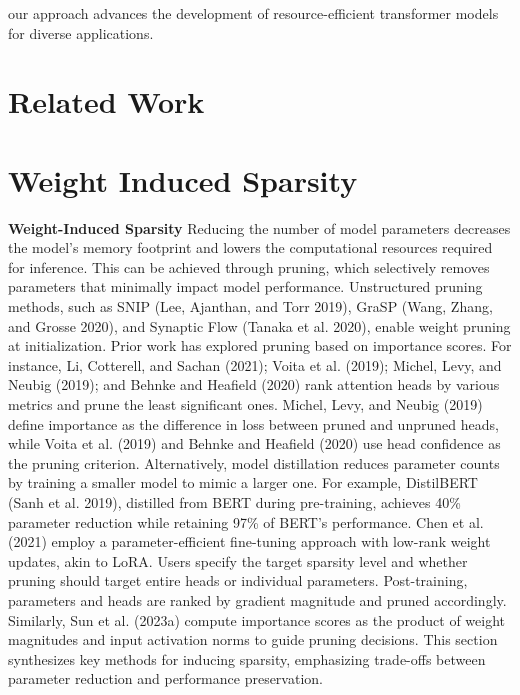 \documentclass[10pt,twocolumn]{article}
\begin{document}
our approach advances the development of resource-efficient transformer models for diverse applications.




\section{Related Work}




\section{Weight Induced Sparsity}

\textbf{Weight-Induced Sparsity} Reducing the number of model parameters decreases the model's memory footprint and lowers the computational resources required for inference. This can be achieved through pruning, which selectively removes parameters that minimally impact model performance. Unstructured pruning methods, such as SNIP (Lee, Ajanthan, and Torr 2019), GraSP (Wang, Zhang, and Grosse 2020), and Synaptic Flow (Tanaka et al. 2020), enable weight pruning at initialization. Prior work has explored pruning based on importance scores. For instance, Li, Cotterell, and Sachan (2021); Voita et al. (2019); Michel, Levy, and Neubig (2019); and Behnke and Heafield (2020) rank attention heads by various metrics and prune the least significant ones. Michel, Levy, and Neubig (2019) define importance as the difference in loss between pruned and unpruned heads, while Voita et al. (2019) and Behnke and Heafield (2020) use head confidence as the pruning criterion. Alternatively, model distillation reduces parameter counts by training a smaller model to mimic a larger one. For example, DistilBERT (Sanh et al. 2019), distilled from BERT during pre-training, achieves 40\% parameter reduction while retaining 97\% of BERT's performance. Chen et al. (2021) employ a parameter-efficient fine-tuning approach with low-rank weight updates, akin to LoRA. Users specify the target sparsity level and whether pruning should target entire heads or individual parameters. Post-training, parameters and heads are ranked by gradient magnitude and pruned accordingly. Similarly, Sun et al. (2023a) compute importance scores as the product of weight magnitudes and input activation norms to guide pruning decisions. This section synthesizes key methods for inducing sparsity, emphasizing trade-offs between parameter reduction and performance preservation.
\end{document}
